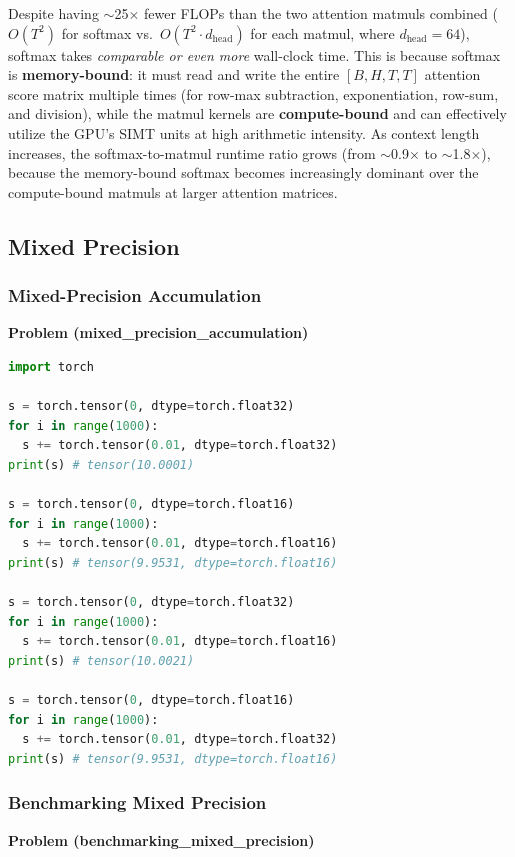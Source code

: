 \documentclass[11pt]{article}
\begin{document}
Despite having $\sim$25$\times$ fewer FLOPs than the two attention
matmuls combined ($O(T^2)$ for softmax vs.\ $O(T^2 \cdot d_{\text{head}})$
for each matmul, where $d_{\text{head}} = 64$), softmax takes
\emph{comparable or even more} wall-clock time.
This is because softmax is \textbf{memory-bound}: it must read and write
the entire $[B, H, T, T]$ attention score matrix multiple times
(for row-max subtraction, exponentiation, row-sum, and division),
while the matmul kernels are \textbf{compute-bound} and can effectively
utilize the GPU's SIMT units at high arithmetic intensity.
As context length increases, the softmax-to-matmul runtime ratio grows
(from $\sim$0.9$\times$ to $\sim$1.8$\times$), because the
memory-bound softmax becomes increasingly dominant over the
compute-bound matmuls at larger attention matrices.


\subsection{Mixed Precision}

\subsubsection{Mixed-Precision Accumulation}
\textbf{Problem (mixed\_precision\_accumulation)}

\begin{lstlisting}[language=Python, caption=Mixed-Precision Accumulation]
import torch

s = torch.tensor(0, dtype=torch.float32)
for i in range(1000):
  s += torch.tensor(0.01, dtype=torch.float32)
print(s) # tensor(10.0001)

s = torch.tensor(0, dtype=torch.float16)
for i in range(1000):
  s += torch.tensor(0.01, dtype=torch.float16)
print(s) # tensor(9.9531, dtype=torch.float16)

s = torch.tensor(0, dtype=torch.float32)
for i in range(1000):
  s += torch.tensor(0.01, dtype=torch.float16)
print(s) # tensor(10.0021)

s = torch.tensor(0, dtype=torch.float16)
for i in range(1000):
  s += torch.tensor(0.01, dtype=torch.float32)
print(s) # tensor(9.9531, dtype=torch.float16)

\end{lstlisting}

\subsubsection{Benchmarking Mixed Precision}
\textbf{Problem (benchmarking\_mixed\_precision)}
\end{document}
